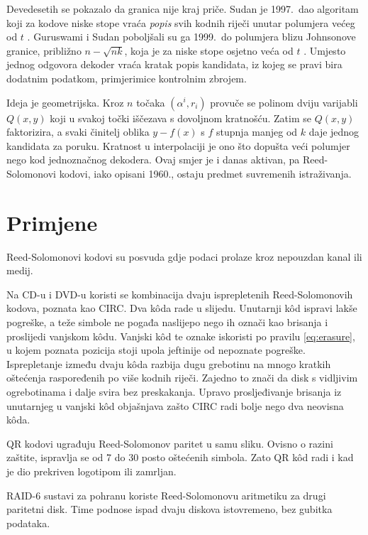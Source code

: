 \documentclass{mathos}
\begin{document}
Devedesetih se pokazalo da granica nije kraj priče. Sudan je 1997.\ dao algoritam koji za kodove niske stope vraća \emph{popis} svih kodnih riječi unutar polumjera većeg od $t$ \cite{sudan}. Guruswami i Sudan poboljšali su ga 1999.\ do polumjera blizu Johnsonove granice, približno $n - \sqrt{n k}$, koja je za niske stope osjetno veća od $t$ \cite{gurusudan}. Umjesto jednog odgovora dekoder vraća kratak popis kandidata, iz kojeg se pravi bira dodatnim podatkom, primjerimice kontrolnim zbrojem.

Ideja je geometrijska. Kroz $n$ točaka $(\alpha^i, r_i)$ provuče se polinom dviju varijabli $Q(x,y)$ koji u svakoj točki iščezava s dovoljnom kratnošću. Zatim se $Q(x,y)$ faktorizira, a svaki činitelj oblika $y - f(x)$ s $f$ stupnja manjeg od $k$ daje jednog kandidata za poruku. Kratnost u interpolaciji je ono što dopušta veći polumjer nego kod jednoznačnog dekodera. Ovaj smjer je i danas aktivan, pa Reed-Solomonovi kodovi, iako opisani 1960., ostaju predmet suvremenih istraživanja.


\chapter{Primjene}\label{primjene}

\noindent
Reed-Solomonovi kodovi su posvuda gdje podaci prolaze kroz nepouzdan kanal ili medij.

Na CD-u i DVD-u koristi se kombinacija dvaju isprepletenih Reed-Solomonovih kodova, poznata kao CIRC. Dva kôda rade u slijedu. Unutarnji kôd ispravi lakše pogreške, a teže simbole ne pogađa naslijepo nego ih označi kao brisanja i proslijedi vanjskom kôdu. Vanjski kôd te oznake iskoristi po pravilu \eqref{eq:erasure}, u kojem poznata pozicija stoji upola jeftinije od nepoznate pogreške. Isprepletanje između dvaju kôda razbija dugu grebotinu na mnogo kratkih oštećenja raspoređenih po više kodnih riječi. Zajedno to znači da disk s vidljivim ogrebotinama i dalje svira bez preskakanja. Upravo prosljeđivanje brisanja iz unutarnjeg u vanjski kôd objašnjava zašto CIRC radi bolje nego dva neovisna kôda.

QR kodovi ugrađuju Reed-Solomonov paritet u samu sliku. Ovisno o razini zaštite, ispravlja se od 7 do 30 posto oštećenih simbola. Zato QR kôd radi i kad je dio prekriven logotipom ili zamrljan.

RAID-6 sustavi za pohranu koriste Reed-Solomonovu aritmetiku za drugi paritetni disk. Time podnose ispad dvaju diskova istovremeno, bez gubitka podataka.
\end{document}
